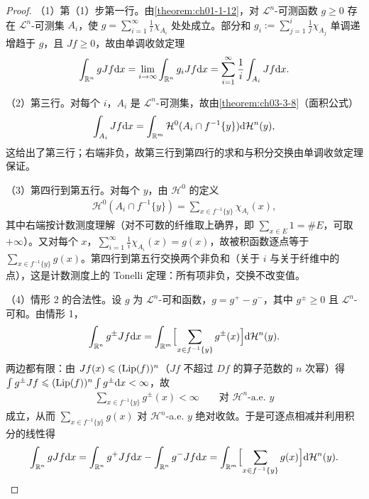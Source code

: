 \documentclass[../../main.tex]{subfiles}%
\begin{document}
\begin{proof}
（1）第（1）步第一行。由\cref{theorem:ch01-1-12}，对 $\mathcal{L}^n$-可测函数 $g\geqslant0$ 存在 $\mathcal{L}^n$-可测集 $A_i$，使 $g=\sum_{i=1}^{\infty}\frac1i\chi_{A_i}$ 处处成立。部分和 $g_i:=\sum_{j=1}^{i}\frac1j\chi_{A_j}$ 单调递增趋于 $g$，且 $Jf\geqslant0$，故由单调收敛定理%
\begin{align*}
\int_{\mathbb{R}^n}gJf\mathrm{d} x=\lim_{i\to\infty}\int_{\mathbb{R}^n}g_iJf\mathrm{d} x=\sum_{i=1}^{\infty}\frac1i\int_{A_i}Jf\mathrm{d} x .
\end{align*}

（2）第三行。对每个 $i$，$A_i$ 是 $\mathcal{L}^n$-可测集，故由\cref{theorem:ch03-3-8}（面积公式） %
\begin{align*}
\int_{A_i}Jf\mathrm{d} x=\int_{\mathbb{R}^m}\mathcal{H}^0(A_i\cap f^{-1}\{y\})\mathrm{d}\mathcal{H}^n(y),
\end{align*}
这给出了第三行；右端非负，故第三行到第四行的求和与积分交换由单调收敛定理保证。

（3）第四行到第五行。对每个 $y$，由 $\mathcal{H}^0$ 的定义
\begin{align*}
\mathcal{H}^0(A_i\cap f^{-1}\{y\})=\sum_{x\in f^{-1}\{y\}}\chi_{A_i}(x),
\end{align*}
其中右端按计数测度理解（对不可数的纤维取上确界，即 $\sum_{x\in E}1=\#E$，可取 $+\infty$）。又对每个 $x$，$\sum_{i=1}^{\infty}\frac1i\chi_{A_i}(x)=g(x)$，故被积函数逐点等于 $\sum_{x\in f^{-1}\{y\}}g(x)$。第四行到第五行交换两个非负和（关于 $i$ 与关于纤维中的点），这是计数测度上的 Tonelli 定理：所有项非负，交换不改变值。

（4）情形 2 的合法性。设 $g$ 为 $\mathcal{L}^n$-可和函数，$g=g^+-g^-$，其中 $g^\pm\geqslant0$ 且 $\mathcal{L}^n$-可和。由情形 1，
\begin{align*}
\int_{\mathbb{R}^n}g^{\pm}Jf\mathrm{d} x=\int_{\mathbb{R}^m}\Bigl[\sum_{x\in f^{-1}\{y\}}g^{\pm}(x)\Bigr]\mathrm{d}\mathcal{H}^n(y).
\end{align*}
两边都有限：由 $Jf(x)\leqslant(\operatorname{Lip}(f))^n$（$Jf$ 不超过 $Df$ 的算子范数的 $n$ 次幂）得 $\int g^{\pm}Jf\leqslant(\operatorname{Lip}(f))^n\int g^{\pm}\mathrm{d} x<\infty$，故
\begin{align*}
\sum_{x\in f^{-1}\{y\}}g^{\pm}(x)<\infty\qquad\text{对 }\mathcal{H}^n\text{-a.e. }y
\end{align*}
成立，从而 $\sum_{x\in f^{-1}\{y\}}g(x)$ 对 $\mathcal{H}^n$-a.e. $y$ 绝对收敛。于是可逐点相减并利用积分的线性得
\begin{align*}
\int_{\mathbb{R}^n}gJf\mathrm{d} x=\int_{\mathbb{R}^n}g^+Jf\mathrm{d} x-\int_{\mathbb{R}^n}g^-Jf\mathrm{d} x=\int_{\mathbb{R}^m}\Bigl[\sum_{x\in f^{-1}\{y\}}g(x)\Bigr]\mathrm{d}\mathcal{H}^n(y).
\end{align*}
\end{proof}
\end{document}

